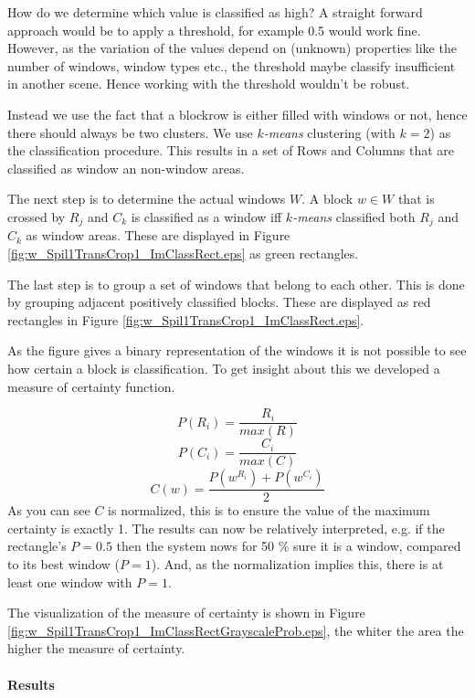 How do we determine which value is classified as high?  A straight forward
approach would be to apply a threshold, for example 0.5 would work fine.
However, as the variation of the values depend on (unknown) properties like the
number of windows, window types etc., the threshold maybe classify insufficient
in another scene.  Hence working with the threshold wouldn't be robust. 

Instead we use the fact that a blockrow is either filled with windows or not, hence
there should always be two clusters.  We use \emph{$k$-means} clustering (with
$k=2$) as the classification procedure.
This results in a set of Rows and Columns that are classified as window an
non-window areas.

The next step is to determine the actual windows $W$.
A block $w\in W$ that is crossed by $R_j$ and $C_k$ is classified as a
window iff \emph{$k$-means} classified both $R_j$ and $C_k$ as window areas. These are displayed in 
 Figure \ref{fig:w_Spil1TransCrop1_ImClassRect.eps} as green rectangles.

The last step is to group a set of windows that belong to each other. This is done by 
grouping adjacent positively classified blocks. These are displayed as red
rectangles in Figure \ref{fig:w_Spil1TransCrop1_ImClassRect.eps}.

As the figure gives a binary representation of the windows it is not possible
to see how certain a block is classification.
To get insight about this we developed a measure of certainty function.

\[P(R_i) = \frac{R_i}{max(R)}\]
\[P(C_i) = \frac{C_i}{max(C)}\]
\[C(w) = \frac{P(w^{R_i}) + P(w^{C_i})}{2}\]
As you can see $C$ is normalized, this is to ensure the value of the maximum
certainty is exactly 1. The results can now be relatively interpreted, e.g. if the rectangle's $P=0.5$
then the system nows for 50 \% sure it is a window, compared to its best window ($P=1$). 
And, as the normalization implies this, there is at least one window with $P=1$. 

The visualization of the measure of certainty is shown in Figure
\ref{fig:w_Spil1TransCrop1_ImClassRectGrayscaleProb.eps},  
the whiter the area the higher the measure of certainty.

\paragraph{Results} 
\newpage
{}

